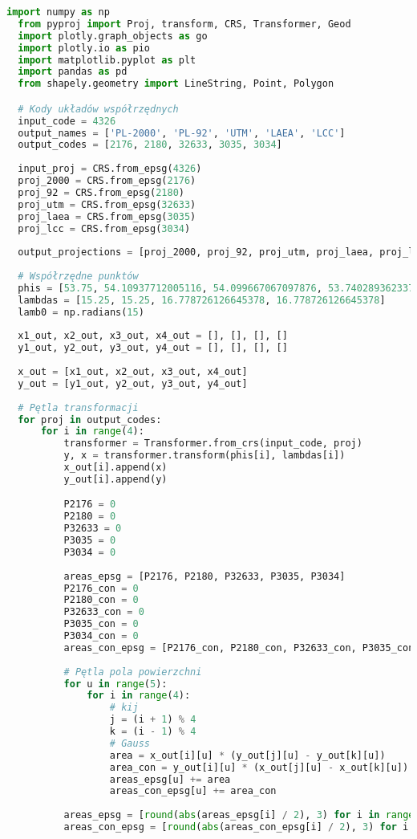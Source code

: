 \documentclass[fleqn,10pt,a4paper]{article}
\begin{document}
\begin{lstlisting}[language=Python, caption=Transformacje współrzędnych i pole powierzchni, label = kod:transformacje, style = mycode]
  import numpy as np
  from pyproj import Proj, transform, CRS, Transformer, Geod
  import plotly.graph_objects as go
  import plotly.io as pio
  import matplotlib.pyplot as plt
  import pandas as pd
  from shapely.geometry import LineString, Point, Polygon

  # Kody układów współrzędnych
  input_code = 4326
  output_names = ['PL-2000', 'PL-92', 'UTM', 'LAEA', 'LCC']
  output_codes = [2176, 2180, 32633, 3035, 3034]
  
  input_proj = CRS.from_epsg(4326)
  proj_2000 = CRS.from_epsg(2176)
  proj_92 = CRS.from_epsg(2180)
  proj_utm = CRS.from_epsg(32633)
  proj_laea = CRS.from_epsg(3035)
  proj_lcc = CRS.from_epsg(3034)
  
  output_projections = [proj_2000, proj_92, proj_utm, proj_laea, proj_lcc]
  
  # Współrzędne punktów
  phis = [53.75, 54.10937712005116, 54.099667067097876, 53.74028936233757] 
  lambdas = [15.25, 15.25, 16.778726126645378, 16.778726126645378]
  lamb0 = np.radians(15)
  
  x1_out, x2_out, x3_out, x4_out = [], [], [], []
  y1_out, y2_out, y3_out, y4_out = [], [], [], []
  
  x_out = [x1_out, x2_out, x3_out, x4_out]
  y_out = [y1_out, y2_out, y3_out, y4_out]
  
  # Pętla transformacji
  for proj in output_codes:
      for i in range(4):
          transformer = Transformer.from_crs(input_code, proj)
          y, x = transformer.transform(phis[i], lambdas[i])
          x_out[i].append(x)
          y_out[i].append(y)

          P2176 = 0
          P2180 = 0
          P32633 = 0
          P3035 = 0
          P3034 = 0
          
          areas_epsg = [P2176, P2180, P32633, P3035, P3034]
          P2176_con = 0
          P2180_con = 0
          P32633_con = 0
          P3035_con = 0
          P3034_con = 0
          areas_con_epsg = [P2176_con, P2180_con, P32633_con, P3035_con, P3034_con]
          
          # Pętla pola powierzchni
          for u in range(5):
              for i in range(4):
                  # kij
                  j = (i + 1) % 4
                  k = (i - 1) % 4
                  # Gauss
                  area = x_out[i][u] * (y_out[j][u] - y_out[k][u])
                  area_con = y_out[i][u] * (x_out[j][u] - x_out[k][u])
                  areas_epsg[u] += area
                  areas_con_epsg[u] += area_con
          
          areas_epsg = [round(abs(areas_epsg[i] / 2), 3) for i in range(5)]
          areas_con_epsg = [round(abs(areas_con_epsg[i] / 2), 3) for i in range(5)]
  
\end{lstlisting}
\end{document}
